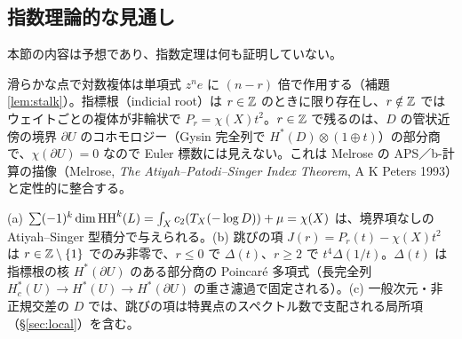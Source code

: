 \subsection{指数理論的な見通し}\label{sec:index}
本節の内容は予想であり、指数定理は何も証明していない。
\begin{obs}
滑らかな点で対数複体は単項式 $z^ne$ に $(n-r)$ 倍で作用する（補題 \ref{lem:stalk}）。指標根（indicial root）は $r\in\mathbb Z$ のときに限り存在し、$r\notin\mathbb Z$ ではウェイトごとの複体が非輪状で $P_r=\chi(X)t^2$。$r\in\mathbb Z$ で残るのは、$D$ の管状近傍の境界 $\partial U$ のコホモロジー（Gysin 完全列で $H^*(D)\otimes(1\oplus t)$）の部分商で、$\chi(\partial U)=0$ なので Euler 標数には見えない。これは Melrose の APS／b-計算の描像（Melrose, \emph{The Atiyah--Patodi--Singer Index Theorem}, A K Peters 1993）と定性的に整合する。
\end{obs}
\begin{conj}\tK\label{conj:I3}
(a) $\sum(-1)^k\dim\mathrm{HH}^k(L)=\int_Xc_2(T_X(-\log D))+\mu=\chi(X)$ は、境界項なしの Atiyah--Singer 型積分で与えられる。(b) 跳びの項 $J(r)=P_r(t)-\chi(X)t^2$ は $r\in\mathbb Z\setminus\{1\}$ でのみ非零で、$r\le0$ で $\Delta(t)$、$r\ge2$ で $t^4\Delta(1/t)$。$\Delta(t)$ は指標根の核 $H^*(\partial U)$ のある部分商の Poincaré 多項式（長完全列 $H_c^*(U)\to H^*(U)\to H^*(\partial U)$ の重さ濾過で固定される）。(c) 一般次元・非正規交差の $D$ では、跳びの項は特異点のスペクトル数で支配される局所項（\S\ref{sec:local}）を含む。
\end{conj}
